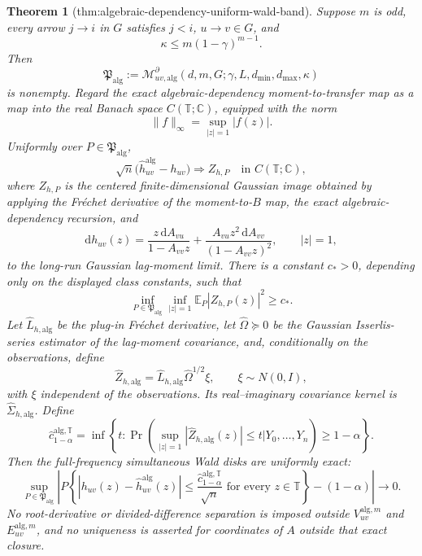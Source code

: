 \documentclass{article}
\newtheorem{theorem}{Theorem}
\begin{document}
\begin{theorem}[thm:algebraic-dependency-uniform-wald-band]\label{thm:algebraic-dependency-uniform-wald-band}
Suppose \(m\) is odd, every arrow \(j\to i\) in \(G\) satisfies \(j<i\), \(u\to v\in G\), and
\[
 \kappa\le m(1-\gamma)^{m-1}.
\]
Then
\[
 \mathfrak P_{\mathrm{alg}}
 :=\mathcal M_{uv,\mathrm{alg}}^{\partial}
 (d,m,G;\gamma,L,d_{\min},d_{\max},\kappa)
\]
is nonempty.  Regard the exact algebraic-dependency moment-to-transfer map as a map into the real Banach space \(C(\mathbb T;\mathbb C)\), equipped with the norm
\[
 \|f\|_{\infty}=\sup_{|z|=1}|f(z)|.
\]
Uniformly over \(P\in\mathfrak P_{\mathrm{alg}}\),
\[
 \sqrt n\bigl(\widehat h_{uv}^{\mathrm{alg}}-h_{uv}\bigr)
 \Longrightarrow Z_{h,P}
 \quad\text{in }C(\mathbb T;\mathbb C),
\]
where \(Z_{h,P}\) is the centered finite-dimensional Gaussian image obtained by applying the Fr\'echet derivative of the moment-to-\(B\) map, the exact algebraic-dependency recursion, and
\[
 \mathrm dh_{uv}(z)
 =\frac{z\,\mathrm dA_{vu}}{1-A_{vv}z}
  +\frac{A_{vu}z^2\,\mathrm dA_{vv}}{(1-A_{vv}z)^2},
 \qquad |z|=1,
\]
to the long-run Gaussian lag-moment limit.  There is a constant \(c_*>0\), depending only on the displayed class constants, such that
\[
 \inf_{P\in\mathfrak P_{\mathrm{alg}}}
 \inf_{|z|=1}\mathbb E_P|Z_{h,P}(z)|^2\ge c_*.
\]
Let \(\widehat L_{h,\mathrm{alg}}\) be the plug-in Fr\'echet derivative, let \(\widehat\Omega\succeq0\) be the Gaussian Isserlis-series estimator of the lag-moment covariance, and, conditionally on the observations, define
\[
 \widehat Z_{h,\mathrm{alg}}
 =\widehat L_{h,\mathrm{alg}}\widehat\Omega^{1/2}\xi,
 \qquad \xi\sim N(0,I),
\]
with \(\xi\) independent of the observations.  Its real--imaginary covariance kernel is \(\widehat\Sigma_{h,\mathrm{alg}}\).  Define
\[
 \widehat c_{1-\alpha}^{\mathrm{alg},\mathbb T}
 =\inf\left\{t:
 \Pr\!\left(
  \sup_{|z|=1}|\widehat Z_{h,\mathrm{alg}}(z)|\le t
  \mathrel{\big|}Y_0,\ldots,Y_n
 \right)\ge1-\alpha\right\}.
\]
Then the full-frequency simultaneous Wald disks are uniformly exact:
\[
 \sup_{P\in\mathfrak P_{\mathrm{alg}}}
 \left|
 P\!\left\{
  |h_{uv}(z)-\widehat h_{uv}^{\mathrm{alg}}(z)|
  \le\frac{\widehat c_{1-\alpha}^{\mathrm{alg},\mathbb T}}{\sqrt n}
  \text{ for every }z\in\mathbb T
 \right\}-(1-\alpha)
 \right|\longrightarrow0.
\]
No root-derivative or divided-difference separation is imposed outside \(V_{uv}^{\mathrm{alg},m}\) and \(E_{uv}^{\mathrm{alg},m}\), and no uniqueness is asserted for coordinates of \(A\) outside that exact closure.
\end{theorem}
\end{document}

